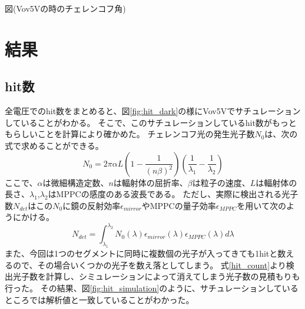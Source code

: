 \documentclass[uplatex, titlepage, dvipdfmx, 12pt, a4paper]{jsreport}
\begin{document}
      図(Vov5Vの時のチェレンコフ角)\\

\chapter{結果}
  \section{hit数}
    全電圧でのhit数をまとめると、図\ref{fig:hit_dark}の様にVov5Vでサチュレーションしていることがわかる。
    そこで、このサチュレーションしているhit数がもっともらしいことを計算により確かめた。
    チェレンコフ光の発生光子数$N_{0}$は、次の式で求めることができる。
    \begin{equation}
        N_{0} = 2 \pi \alpha L  \left(1 - \frac{1}{(n\beta)^2}\right) \left(\frac{1}{\lambda_{1}} - \frac{1}{\lambda_{2}}\right)
    \end{equation}
    ここで、$\alpha$は微細構造定数、$n$は輻射体の屈折率、$\beta$は粒子の速度、$L$は輻射体の長さ、$\lambda_{1}$,$\lambda_{2}$はMPPCの感度のある波長である。
    ただし、実際に検出される光子数$N_{det}$はこの$N_{0}$に鏡の反射効率$\epsilon_{mirror}$やMPPCの量子効率$\epsilon_{MPPC}$を用いて次のようにかける。
    \begin{equation}
        N_{det} = \int^{\lambda_2}_{\lambda_1} N_{0}\left(\lambda\right) \epsilon_{mirror}\left(\lambda\right) \epsilon_{MPPC}\left(\lambda\right) d\lambda
        \label{hit_count}
    \end{equation}
    また、今回は1つのセグメントに同時に複数個の光子が入ってきても1hitと数えるので、その場合いくつかの光子を数え落としてしまう。
    式\ref{hit_count}より検出光子数を計算し、シミュレーションによって消えてしまう光子数の見積もりも行った。
    その結果、図\ref{fig:hit_simulation}のように、サチュレーションしているところでは解析値と一致していることがわかった。
\end{document}
